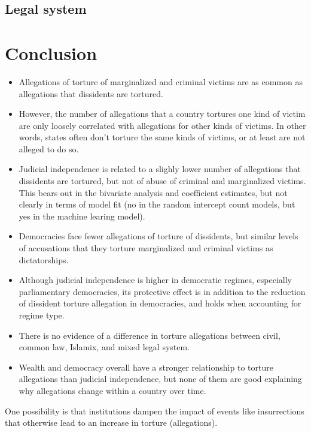 \documentclass[12pt]{article}
\begin{document}
\subsection*{Legal system}



\section*{Conclusion}

\begin{itemize}
\item Allegations of torture of marginalized and criminal victims are as common as allegations that dissidents are tortured.
\item However, the number of allegations that a country tortures one kind of victim are only loosely correlated with allegations for other kinds of victims. In other words, states often don't torture the same kinds of victims, or at least are not alleged to do so.
\item Judicial independence is related to a slighly lower number of allegations that dissidents are tortured, but not of abuse of criminal and marginalized victims. This bears out in the bivariate analysis and coefficient estimates, but not clearly in terms of model fit (no in the random intercept count models, but yes in the machine learing model). 
\item Democracies face fewer allegations of torture of dissidents, but similar levels of accusations that they torture marginalized and criminal victims as dictatorships. 
\item Although judicial independence is higher in democratic regimes, especially parliamentary democracies, its protective effect is in addition to the reduction of dissident torture allegation in democracies, and holds when accounting for regime type. 
\item There is no evidence of a difference in torture allegations between civil, common law, Islamix, and mixed legal system. 
\item Wealth and democracy overall have a stronger relationship to torture allegations than judicial independence, but none of them are good explaining why allegations change within a country over time.
\end{itemize}

One possibility is that institutions dampen the impact of events like insurrections that otherwise lead to an increase in torture (allegations). 

\clearpage
\begin{singlespace}


\end{singlespace}
\end{document}
